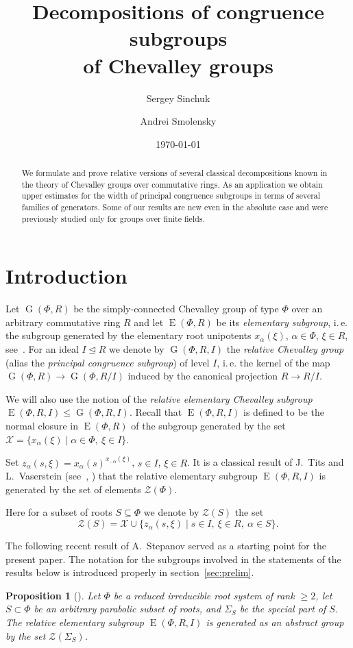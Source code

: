 \documentclass[oneside, 12pt]{amsart}
\title [Decompositions of congruence subgroups of Chevalley groups] {Decompositions of congruence subgroups \\ of Chevalley groups}
\author{Sergey Sinchuk}
\author{Andrei Smolensky}
\date {\today}
\theoremstyle{plain}
\numberwithin{equation}{section}
\numberwithin{lemma}{section}
\newtheorem{prop}[lemma]{Proposition}
\theoremstyle{definition}
\theoremstyle{remark}
\DeclareMathOperator{\G}{G}
\DeclareMathOperator{\E}{E}
\begin{document}
\begin{abstract} 
We formulate and prove relative versions of several classical decompositions known in the theory of Chevalley groups over commutative rings. %
As an application we obtain upper estimates for the width of principal congruence subgroups in terms of several families of generators.
Some of our results are new even in the absolute case and were previously studied only for groups over finite fields.
\end{abstract}

\maketitle

\section{Introduction}\label{sec:intro}
Let $\G(\Phi, R)$ be the simply-connected Chevalley group of type $\Phi$ over an arbitrary commutative ring $R$ and let $\E(\Phi, R)$ be its \emph{elementary subgroup},
i.\,e. the subgroup generated by the elementary root unipotents $x_\alpha(\xi)$, $\alpha\in\Phi$, $\xi\in R$, see~\cite{VP, St78, S}.
For an ideal $I \trianglelefteq R$ we denote by $\G(\Phi, R, I)$ the \emph{relative Chevalley group} (alias the \emph{principal congruence subgroup}) of level $I$, 
i.\,e. the kernel of the map $\G(\Phi, R)\rightarrow\G(\Phi, R/I)$ induced by the canonical projection $R\rightarrow R/I$.

We will also use the notion of the \emph{relative elementary Chevalley subgroup} $\E(\Phi, R, I) \leqslant \G(\Phi, R, I)$.
Recall that $\E(\Phi, R, I)$ is defined to be the normal closure in $\E(\Phi, R)$ of the subgroup generated by the set $\mathcal{X} = \{x_\alpha(\xi) \mid \alpha\in \Phi, \ \xi \in I \}$.

Set $z_\alpha(s, \xi) = x_{\alpha}(s)^{x_{-\alpha}(\xi)}$, $s\in I$, $\xi\in R$.
It is a classical result of J.~Tits and L.~Vaserstein (see~\cite{Tits76}, \cite[Theorem~2]{Va86}) that the relative elementary subgroup $\E(\Phi, R, I)$ is generated by
the set of elements $\mathcal{Z}(\Phi)$.

Here for a subset of roots $S\subseteq\Phi$ we denote by $\mathcal{Z}(S)$ the set
\[ \mathcal{Z}(S) =  \mathcal{X} \cup \{ z_\alpha(s, \xi) \mid s\in I, \ \xi \in R, \ \alpha \in S\}.\]

The following recent result of A.~Stepanov served as a starting point for the present paper.
The notation for the subgroups involved in the statements of the results below is introduced properly in section~\ref{sec:prelim}.
\begin{prop}[{\cite[Theorem~3.4]{S}}] \label{prop:Stepanov}
Let $\Phi$ be a reduced irreducible root system of rank $\geq 2$, let $S \subset \Phi$ be an arbitrary parabolic subset of roots, and $\Sigma_S$ be the special part of $S$. The relative elementary subgroup $\E(\Phi, R, I)$ is generated as an abstract group by the set $\mathcal{Z}(\Sigma_S)$. \end{prop}
\end{document}
